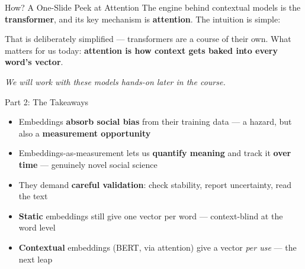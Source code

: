 \documentclass[aspectratio=169]{beamer}
\begin{document}
\begin{frame}{How? A One-Slide Peek at Attention}
\vspace{0.2cm}
{\small The engine behind contextual models is the \textbf{transformer}, and its key
mechanism is \textbf{attention}. The intuition is simple:}

\medskip
{}

\medskip
{\small That is deliberately simplified --- transformers are a course of their own. What
matters for us today: \textbf{attention is how context gets baked into every word's vector}.}

\medskip
{\small\textcolor{midgray}{\textit{We will work with these models hands-on later in the course.}}}
\end{frame}

\begin{frame}{Part 2: The Takeaways}
\vspace{0.25cm}
\begin{itemize}\setlength\itemsep{8pt}
  \item[\textcolor{wurgreen}{\faCheck}]
    Embeddings \textbf{absorb social bias} from their training data --- a hazard, but also a
    \textbf{measurement opportunity}
  \item[\textcolor{wurgreen}{\faCheck}]
    Embeddings-as-measurement lets us \textbf{quantify meaning} and track it \textbf{over
    time} --- genuinely novel social science
  \item[\textcolor{wurgreen}{\faCheck}]
    They demand \textbf{careful validation}: check stability, report uncertainty, read the text
  \item[\textcolor{wurgreen}{\faCheck}]
    \textbf{Static} embeddings still give one vector per word --- context-blind at the word level
  \item[\textcolor{wurgreen}{\faCheck}]
    \textbf{Contextual} embeddings (BERT, via attention) give a vector \emph{per use} --- the
    next leap
\end{itemize}

\medskip
{}
\end{frame}
\end{document}
